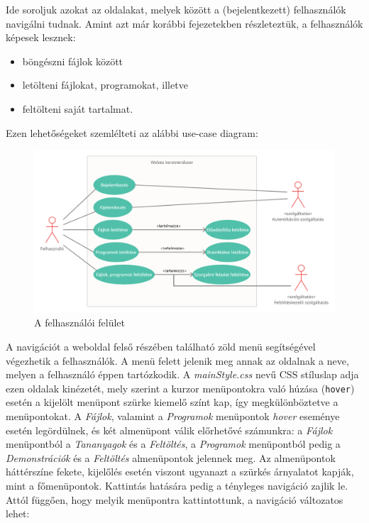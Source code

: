 Ide soroljuk azokat az oldalakat, melyek között a (bejelentkezett) felhasználók navigálni tudnak. Amint azt már korábbi fejezetekben részleteztük, a felhasználók képesek lesznek:

\begin{itemize}
\item{böngészni fájlok között}
\item{letölteni fájlokat, programokat, illetve}
\item{feltölteni saját tartalmat.}
\end{itemize}

Ezen lehetőségeket szemlélteti az alábbi use-case diagram:

\newpage

\begin{figure}[h]
	\centering
		\includegraphics[width=15truecm, height=10truecm]{images/felhasznalo_use_case.png}
	\caption{A felhasználói felület}
	\label{fig:userusecase}
\end{figure}

A navigációt a weboldal felső részében található zöld menü segítségével végezhetik a felhasználók. A menü felett jelenik meg annak az oldalnak a neve, melyen a felhasználó éppen tartózkodik. A \textit{mainStyle.css} nevű CSS stíluslap adja ezen oldalak kinézetét, mely szerint a kurzor menüpontokra való húzása (\texttt{hover}) esetén a kijelölt menüpont szürke kiemelő színt kap, így megkülönböztetve a menüpontokat. A \textit{Fájlok}, valamint a \textit{Programok} menüpontok \textit{hover} eseménye esetén legördülnek, és két almenüpont válik előrhetővé számunkra: a \textit{Fájlok} menüpontból a \textit{Tananyagok} és a \textit{Feltöltés}, a \textit{Programok} menüpontból pedig a \textit{Demonstrációk} és a \textit{Feltöltés} almenüpontok jelennek meg. Az almenüpontok háttérszíne fekete, kijelőlés esetén viszont ugyanazt a szürkés árnyalatot kapják, mint a főmenüpontok. Kattintás hatására pedig a tényleges navigáció zajlik le. Attól függően, hogy melyik menüpontra kattintottunk, a navigáció változatos lehet:

